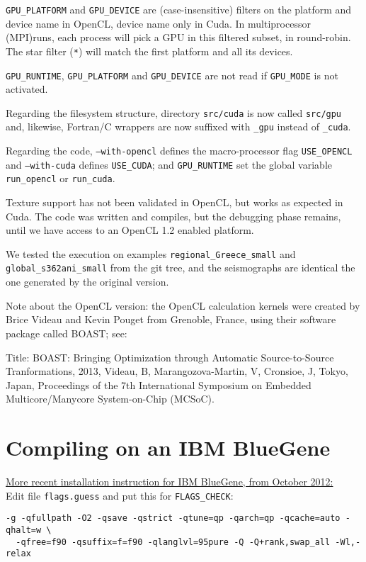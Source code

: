 \texttt{GPU\_PLATFORM} and \texttt{GPU\_DEVICE} are (case-insensitive)
filters on the platform and device name in OpenCL, device name only in
Cuda. In multiprocessor (MPI)runs, each process will pick a GPU in
this filtered subset, in round-robin. The star filter (\texttt{*})
will match the first platform and all its devices.

\texttt{GPU\_RUNTIME}, \texttt{GPU\_PLATFORM} and \texttt{GPU\_DEVICE}
are not read if \texttt{GPU\_MODE} is not activated.

Regarding the filesystem structure, directory \texttt{src/cuda}  is now called
\texttt{src/gpu} and, likewise, Fortran/C wrappers are now suffixed
with \texttt{\_gpu} instead of \texttt{\_cuda}.

Regarding the code, \texttt{--with-opencl} defines the
macro-processor flag \texttt{USE\_OPENCL} and \texttt{--with-cuda}
defines \texttt{USE\_CUDA}; and \texttt{GPU\_RUNTIME} set the global
variable \texttt{run\_opencl} or \texttt{run\_cuda}.

Texture support has not been validated in OpenCL, but works as
expected in Cuda. The code was written and compiles, but the debugging
phase remains, until we have access to an OpenCL 1.2 enabled platform.

We tested the execution on examples \texttt{regional\_Greece\_small}
and \texttt{global\_s362ani\_small} from the git tree, and the
seismographs are identical the one generated by the original version.

Note about the OpenCL version: the OpenCL calculation kernels were
created by Brice Videau and Kevin Pouget from Grenoble, France, using
their software package called BOAST; see:

Title:  BOAST: Bringing Optimization through Automatic Source-to-Source Tranformations,
2013,
Videau, B, Marangozova-Martin, V, Cronsioe, J,
Tokyo, Japan,
Proceedings of the 7th International Symposium on Embedded Multicore/Manycore System-on-Chip (MCSoC).

\section{Compiling on an IBM BlueGene}

\underline{More recent installation instruction for IBM BlueGene, from October 2012:}\\

\noindent
Edit file \texttt{flags.guess} and put this for \texttt{FLAGS\_CHECK}:
\begin{verbatim}
-g -qfullpath -O2 -qsave -qstrict -qtune=qp -qarch=qp -qcache=auto -qhalt=w \
  -qfree=f90 -qsuffix=f=f90 -qlanglvl=95pure -Q -Q+rank,swap_all -Wl,-relax
\end{verbatim}

